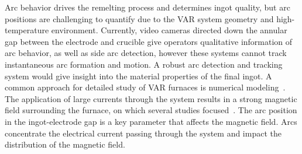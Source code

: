 \documentclass[onehalf,11pt]{beavtex}
\begin{document}
Arc behavior drives the remelting process and determines ingot quality, but arc positions are challenging to quantify due to the VAR system geometry and high-temperature environment.
Currently, video cameras directed down the annular gap between the electrode and crucible give operators qualitative information of arc behavior, as well as side arc detection, however these systems cannot track instantaneous arc formation and motion.
A robust arc detection and tracking system would give insight into the material properties of the final ingot.
A common approach for detailed study of VAR furnaces is numerical modeling~\cite{Gartling:1997ka,Reiter:2003wk,Wang:2005fg,Yang:2010kq,Zhao:2011es,Pericleous:2013kb,Woodside:2013cf,Beaman:2014fi}.
The application of large currents through the system results in a strong magnetic field surrounding the furnace, on which several studies focused~\cite{Wang:2005fg,Nair:2009ja,Woodside:2013cf}.
The arc position in the ingot-electrode gap is a key parameter that affects the magnetic field. 
Arcs concentrate the electrical current passing through the system and impact the distribution of the magnetic field.
\end{document}
